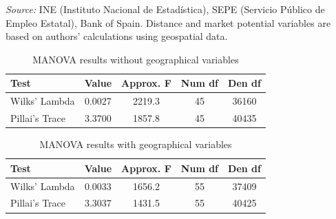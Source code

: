 \documentclass[a4paper,11pt,oneside]{article}
\begin{document}
\begin{table}
\begin{threeparttable}
\begin{tabular}{ll>{\raggedright}p{4.3cm}>{\raggedright\arraybackslash}p{5.2cm}>{\centering\arraybackslash}p{2cm}}
\bottomrule
\end{tabular}

\begin{tablenotes}
\footnotesize
\item[] \textit{Source:} INE (Instituto Nacional de Estadística), SEPE (Servicio Público de Empleo Estatal), Bank of Spain. Distance and market potential variables are based on authors’ calculations using geospatial data.
\end{tablenotes}

\end{threeparttable}
\end{table}



\clearpage
\pagebreak





\clearpage
\pagebreak


\begin{table}[htbp]
\centering
\caption{MANOVA results without geographical variables}
\label{tab:manova_nogeo}
\footnotesize
\begin{tabular}{lcccc}
\toprule
Test & Value & Approx. F & Num df & Den df \\
\midrule
Wilks' Lambda & 0.0027 & 2219.3 & 45 & 36160 \\
Pillai's Trace & 3.3700 & 1857.8 & 45 & 40435 \\
\bottomrule
\end{tabular}
\end{table}




\begin{table}[htbp]
\centering
\caption{MANOVA results with geographical variables}
\label{tab:manova_geo}
\footnotesize
\begin{tabular}{lcccc}
\toprule
Test & Value & Approx. F & Num df & Den df \\
\midrule
Wilks' Lambda & 0.0033 & 1656.2 & 55 & 37409 \\
Pillai's Trace & 3.3037 & 1431.5 & 55 & 40425 \\
\bottomrule
\end{tabular}
\end{table}

\clearpage
\pagebreak
\end{document}
